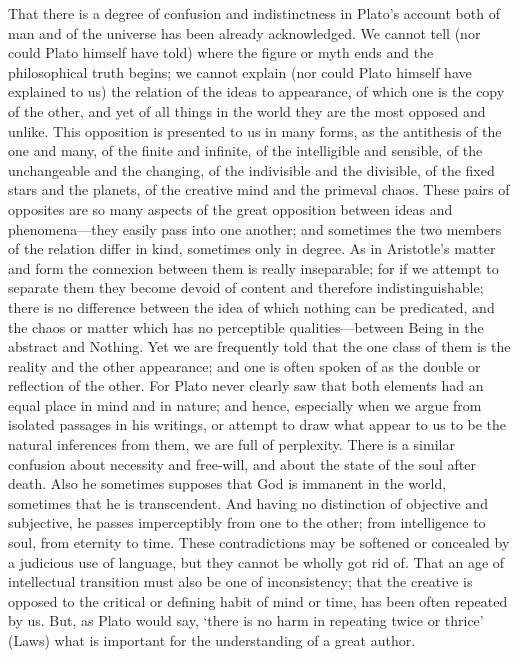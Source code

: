 That there is a degree of confusion and indistinctness in Plato’s account
both of man and of the universe has been already acknowledged. We cannot
tell (nor could Plato himself have told) where the figure or myth ends and
the philosophical truth begins; we cannot explain (nor could Plato himself
have explained to us) the relation of the ideas to appearance, of which
one is the copy of the other, and yet of all things in the world they are
the most opposed and unlike. This opposition is presented to us in many
forms, as the antithesis of the one and many, of the finite and infinite,
of the intelligible and sensible, of the unchangeable and the changing, of
the indivisible and the divisible, of the fixed stars and the planets, of
the creative mind and the primeval chaos. These pairs of opposites are so
many aspects of the great opposition between ideas and phenomena—they
easily pass into one another; and sometimes the two members of the
relation differ in kind, sometimes only in degree. As in Aristotle’s
matter and form the connexion between them is really inseparable; for if
we attempt to separate them they become devoid of content and therefore
indistinguishable; there is no difference between the idea of which
nothing can be predicated, and the chaos or matter which has no
perceptible qualities—between Being in the abstract and Nothing. Yet
we are frequently told that the one class of them is the reality and the
other appearance; and one is often spoken of as the double or reflection
of the other. For Plato never clearly saw that both elements had an equal
place in mind and in nature; and hence, especially when we argue from
isolated passages in his writings, or attempt to draw what appear to us to
be the natural inferences from them, we are full of perplexity. There is a
similar confusion about necessity and free-will, and about the state of
the soul after death. Also he sometimes supposes that God is immanent in
the world, sometimes that he is transcendent. And having no distinction of
objective and subjective, he passes imperceptibly from one to the other;
from intelligence to soul, from eternity to time. These contradictions may
be softened or concealed by a judicious use of language, but they cannot
be wholly got rid of. That an age of intellectual transition must also be
one of inconsistency; that the creative is opposed to the critical or
defining habit of mind or time, has been often repeated by us. But, as
Plato would say, ‘there is no harm in repeating twice or thrice’ (Laws)
what is important for the understanding of a great author.

